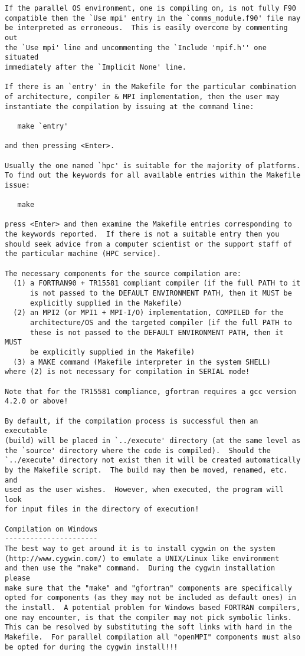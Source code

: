 \begin{verbatim}
If the parallel OS environment, one is compiling on, is not fully F90
compatible then the `Use mpi' entry in the `comms_module.f90' file may
be interpreted as erroneous.  This is easily overcome by commenting out
the `Use mpi' line and uncommenting the `Include 'mpif.h'' one situated
immediately after the `Implicit None' line.

If there is an `entry' in the Makefile for the particular combination
of architecture, compiler & MPI implementation, then the user may
instantiate the compilation by issuing at the command line:

   make `entry'

and then pressing <Enter>.

Usually the one named `hpc' is suitable for the majority of platforms.
To find out the keywords for all available entries within the Makefile
issue:

   make

press <Enter> and then examine the Makefile entries corresponding to
the keywords reported.  If there is not a suitable entry then you
should seek advice from a computer scientist or the support staff of
the particular machine (HPC service).

The necessary components for the source compilation are:
  (1) a FORTRAN90 + TR15581 compliant compiler (if the full PATH to it
      is not passed to the DEFAULT ENVIRONMENT PATH, then it MUST be
      explicitly supplied in the Makefile)
  (2) an MPI2 (or MPI1 + MPI-I/O) implementation, COMPILED for the
      architecture/OS and the targeted compiler (if the full PATH to
      these is not passed to the DEFAULT ENVIRONMENT PATH, then it MUST
      be explicitly supplied in the Makefile)
  (3) a MAKE command (Makefile interpreter in the system SHELL)
where (2) is not necessary for compilation in SERIAL mode!

Note that for the TR15581 compliance, gfortran requires a gcc version
4.2.0 or above!

By default, if the compilation process is successful then an executable
(build) will be placed in `../execute' directory (at the same level as
the `source' directory where the code is compiled).  Should the
`../execute' directory not exist then it will be created automatically
by the Makefile script.  The build may then be moved, renamed, etc. and
used as the user wishes.  However, when executed, the program will look
for input files in the directory of execution!

Compilation on Windows
----------------------
The best way to get around it is to install cygwin on the system
(http://www.cygwin.com/) to emulate a UNIX/Linux like environment
and then use the "make" command.  During the cygwin installation please
make sure that the "make" and "gfortran" components are specifically
opted for components (as they may not be included as default ones) in
the install.  A potential problem for Windows based FORTRAN compilers,
one may encounter, is that the compiler may not pick symbolic links.
This can be resolved by substituting the soft links with hard in the
Makefile.  For parallel compilation all "openMPI" components must also
be opted for during the cygwin install!!!


\end{verbatim}
